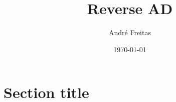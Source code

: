 \documentclass[hidelinks]{article}
\title{Reverse AD}
\author{André Freitas}
\date{\today}
\begin{document}
\maketitle

\section{Section title}
\end{document}
